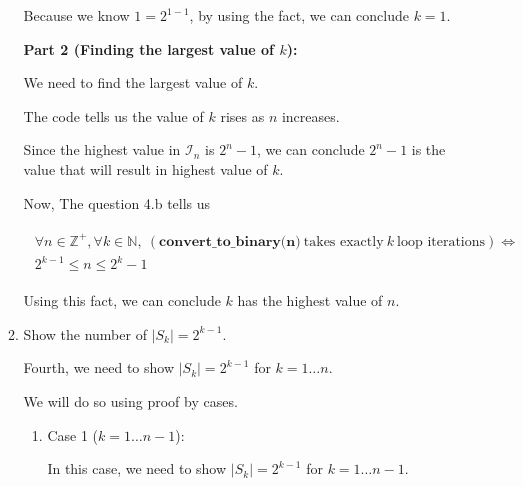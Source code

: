 \documentclass[12pt]{article}
\begin{document}
\begin{enumerate}[a.]
\begin{mdframed}
\begin{enumerate}[1.]
\begin{mdframed}
        Because we know $1 = 2^{1 - 1}$, by using the fact, we can conclude $k = 1$.

        \bigskip

        \textbf{Part 2 (Finding the largest value of $k$):}

        \bigskip

        We need to find the largest value of $k$.

        \bigskip

        The code tells us the value of $k$ rises as $n$ increases.

        \bigskip

        Since the highest value in $\mathcal{I}_n$ is $2^n - 1$, we can conclude
        $2^n - 1$ is the value that will result in highest value of $k$.

        \bigskip

        Now, The question 4.b tells us

        \begin{align}
            \begin{split}
            \forall n \in \mathbb{Z}^+, \forall k \in \mathbb{N},\: (\textbf{
            convert\_to\_binary(n)}\:\text{takes exactly}\:k\:\text{loop iterations}) \Leftrightarrow
            \\ 2^{k-1} \leq n \leq 2^k -1
            \end{split}
        \end{align}

        \bigskip

        Using this fact, we can conclude $k$ has the highest value of $n$.
        \end{mdframed}

        \item Show the number of $\lvert S_k \rvert = 2^{k-1}$.

        \bigskip

        Fourth, we need to show $\lvert S_k \rvert = 2^{k-1}$ for $k = 1 \dots n$.

        \bigskip

        We will do so using proof by cases.

        \bigskip

        \begin{enumerate}[1.]
            \item Case 1 ($k = 1 \dots n-1$):

            \begin{mdframed}
            In this case, we need to show $\lvert S_k \rvert = 2^{k-1}$
            for $k = 1 \dots n-1$.


\end{mdframed}
\end{enumerate}
\end{enumerate}
\end{mdframed}
\end{enumerate}
\end{document}
